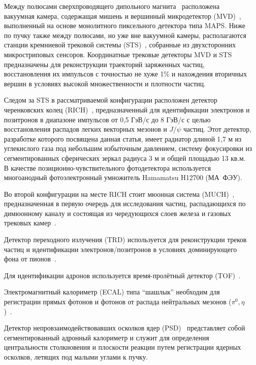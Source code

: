 Между полюсами сверхпроводящего дипольного магнита~\cite{TDR_Magnet} расположена вакуумная камера, содержащая мишень и вершинный микродетектор (MVD)~\cite{MVD_KOZIEL}, выполненный на основе монолитного пиксельного детектора типа MAPS. Ниже по пучку также между полюсами, но уже вне вакуумной камеры, располагаются станции кремниевой трековой системы (STS)~\cite{TDR_STS}, собранные из двухсторонних микростриповых сенсоров. Координатные трековые детекторы MVD и STS предназначены для реконструкции траекторий заряженных частиц, восстановления их импульсов с точностью не хуже 1\% и нахождения вторичных вершин в условиях высокой множественности и плотности частиц.

Следом за STS в рассматриваемой конфигурации расположен детектор черенковских колец (RICH)~\cite{TDR_RICH}, предназначенный для идентификации электронов и позитронов в диапазоне импульсов от 0,5 ГэВ/с до 8 ГэВ/с с целью восстановления распадов легких векторных мезонов и $ J / \psi $ частиц. Этот детектор, разработке которого посвящена данная статья, имеет радиатор длиной 1,7 м из углекислого газа под небольшим избыточным давлением, систему фокусировки из сегментированных сферических зеркал радиуса 3 м и общей площадью 13 кв.м. В качестве позиционно-чувствительного фотодетектора используется многоанодный фотоэлектронный умножитель Hamamatsu H12700 (МА~ФЭУ).

Во второй конфигурации на месте RICH стоит мюонная система (MUCH)~\cite{TDR_MUCH}, предназначенная в первую очередь для исследования частиц, распадающихся по димюонному каналу и состоящая из чередующихся слоев железа и газовых трековых камер~\cite{GEM}.

Детектор переходного излучения (TRD) используется для реконструкции треков частиц и идентификации электронов/позитронов в условиях доминирующего фона от пионов~\cite{TRD}.

Для идентификации адронов используется время-пролётный детектор (TOF)~\cite{TDR_TOF}.

Электромагнитный калориметр (ECAL) типа ``шашлык'' необходим для регистрации прямых фотонов и фотонов от распада нейтральных мезонов ($ \pi^{0}, \eta $)~\cite{ECAL_KOROLKO}.

Детектор непровзаимодействовавших осколков ядер (PSD)~\cite{TDR_PSD} представляет собой сегментированный адронный калориметр и служит для определения центральности столкновения и плоскости реакции путем регистрации ядерных осколков, летящих под малыми углами к пучку.

